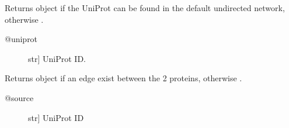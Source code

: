 \documentclass[letterpaper,10pt,english]{sphinxmanual}
\begin{document}
\begin{fulllineitems}
\begin{fulllineitems}
\label{\detokenize{main:pypath.main.PyPath.uniq_ptm}}
\end{fulllineitems}


\begin{fulllineitems}
\label{\detokenize{main:pypath.main.PyPath.uniq_ptms}}
\end{fulllineitems}


\begin{fulllineitems}
\label{\detokenize{main:pypath.main.PyPath.up}}
Returns  object if the UniProt
can be found in the default undirected network,
otherwise .
\begin{description}
\item[{@uniprot}] \leavevmode{[}str{]}
UniProt ID.

\end{description}

\end{fulllineitems}


\begin{fulllineitems}
\label{\detokenize{main:pypath.main.PyPath.up_affected_by}}
\end{fulllineitems}


\begin{fulllineitems}
\label{\detokenize{main:pypath.main.PyPath.up_affects}}
\end{fulllineitems}


\begin{fulllineitems}
\label{\detokenize{main:pypath.main.PyPath.up_edge}}
Returns  object if an edge exist between
the 2 proteins, otherwise .
\begin{description}
\item[{@source}] \leavevmode{[}str{]}
UniProt ID


\end{description}
\end{fulllineitems}
\end{fulllineitems}
\end{document}
